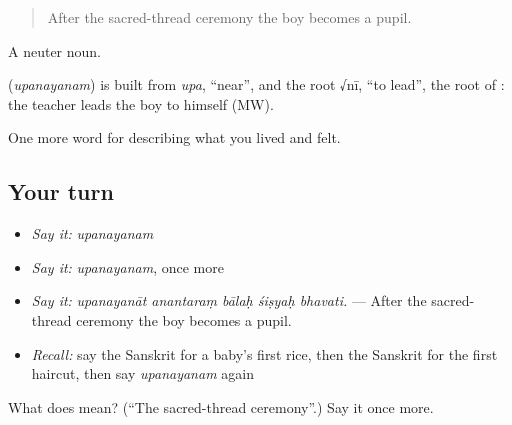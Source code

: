 \begin{quote}
After the sacred-thread ceremony the boy becomes a pupil.
\end{quote}

A neuter noun.

\begin{cousinweb}
\textbf{} (\emph{upanayanam}) is built from \emph{upa}, \textquotedblleft{}near\textquotedblright{}, and the root √nī, \textquotedblleft{}to lead\textquotedblright{}, the root of \textbf{}: the teacher leads the boy to himself (MW).
\end{cousinweb}

\begin{grammarlens}[title={What you've built}]
One more word for describing what you lived and felt.
\end{grammarlens}

\subsection*{Your turn}
\begin{itemize}
\raggedright
  \item \emph{Say it:} \emph{upanayanam}
  \item \emph{Say it:} \emph{upanayanam}, once more
  \item \emph{Say it:} \emph{upanayanāt anantaraṃ bālaḥ śiṣyaḥ bhavati.} — After the sacred-thread ceremony the boy becomes a pupil.
  \item \emph{Recall:} say the Sanskrit for a baby's first rice, then the Sanskrit for the first haircut, then say \emph{upanayanam} again
\end{itemize}

\begin{tcolorbox}[breakable,colback=teal!4,colframe=teal!35!black,title={Before you move on}]
What does  mean? (\textquotedblleft{}The sacred-thread ceremony\textquotedblright{}.) Say it once more.
\end{tcolorbox}
